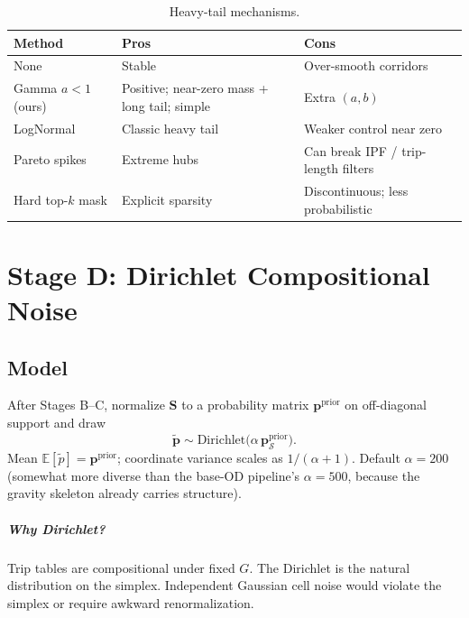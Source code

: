 \documentclass[11pt,a4paper]{report}
\newcommand{\mathbfS}{\mathbf{S}}
\newcommand{\mathbfp}{\mathbf{p}}
\begin{document}
\begin{table}[ht]
\centering
\caption{Heavy-tail mechanisms.}
\label{tab:fp-gamma-pros}
\small
\begin{tabular}{@{}p{3.0cm}p{5.2cm}p{5.2cm}@{}}
\toprule
\textbf{Method} & \textbf{Pros} & \textbf{Cons} \\
\midrule
None &
Stable &
Over-smooth corridors \\
Gamma $a<1$ (ours) &
Positive; near-zero mass + long tail; simple &
Extra $(a,b)$ \\
LogNormal &
Classic heavy tail &
Weaker control near zero \\
Pareto spikes &
Extreme hubs &
Can break IPF / trip-length filters \\
Hard top-$k$ mask &
Explicit sparsity &
Discontinuous; less probabilistic \\
\bottomrule
\end{tabular}
\end{table}


\chapter{Stage D: Dirichlet Compositional Noise}
\label{ch:fp-dirichlet}

\section{Model}

After Stages B--C, normalize $\mathbfS$ to a probability matrix $\mathbfp^{\mathrm{prior}}$ on off-diagonal support and draw
\begin{equation}
  \tilde{\mathbfp} \sim \mathrm{Dirichlet}\!\bigl(\alpha\,\mathbfp^{\mathrm{prior}}_{\mathcal{S}}\bigr).
\end{equation}
Mean $\mathbb{E}[\tilde{p}]=\mathbfp^{\mathrm{prior}}$; coordinate variance scales as $1/(\alpha+1)$. Default $\alpha=200$ (somewhat more diverse than the base-OD pipeline's $\alpha=500$, because the gravity skeleton already carries structure).

\paragraph{Why Dirichlet?}
Trip tables are compositional under fixed $G$. The Dirichlet is the natural distribution on the simplex. Independent Gaussian cell noise would violate the simplex or require awkward renormalization.
\end{document}
